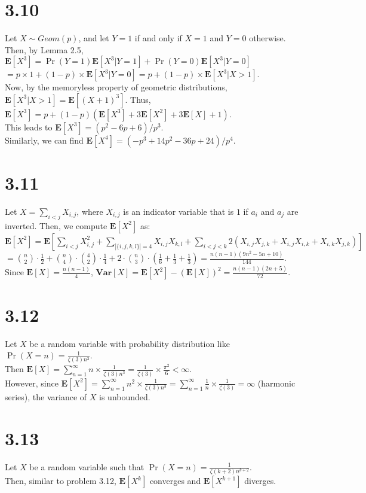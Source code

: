\documentclass{article}
\begin{document}
\section*{3.10}
Let $X\sim Geom(p)$, and let $Y=1$ if and only if $X=1$ and $Y=0$ otherwise. Then, by Lemma 2.5,
$\textbf{E}[X^3]=\Pr(Y=1)\textbf{E}[X^3|Y=1]+\Pr(Y=0)\textbf{E}[X^3|Y=0]$\\
$=p\times 1 + (1-p)\times \textbf{E}[X^3|Y=0]=p+(1-p)\times\textbf{E}[X^3|X>1]$.\\
Now, by the memoryless property of geometric distributions, $\textbf{E}[X^3|X>1]=\textbf{E}[(X+1)^3]$.
Thus, $\textbf{E}[X^3]=p+(1-p)(\textbf{E}[X^3]+3\textbf{E}[X^2]+3\textbf{E}[X]+1)$.\\
This leads to $\textbf{E}[X^3]=(p^2-6p+6)/p^3$.\\
Similarly, we can find $\textbf{E}[X^4]=(-p^3+14p^2-36p+24)/p^4$.
\section*{3.11}
Let $X=\sum\limits_{i<j} X_{i,j}$, where $X_{i,j}$ is an indicator variable that is $1$ if $a_i$ and $a_j$ are inverted. Then, we compute $\textbf{E}[X^2]$ as:\\
$\textbf{E}[X^2]=\textbf{E}[\sum\limits_{i<j}X_{i,j}^2 +\sum\limits_{|\{i,j,k,l\}|=4}X_{i,j}X_{k,l} + \sum\limits_{i<j<k}2(X_{i,j}X_{j,k}+X_{i,j}X_{i,k}+X_{i,k}X_{j,k})]$
$=\binom{n}{2}\cdot\frac{1}{2}+\binom{n}{4}\cdot\binom{4}{2}\cdot\frac{1}{4}+2\cdot\binom{n}{3}\cdot\left( \frac{1}{6}+\frac{1}{3}+\frac{1}{3}\right)=\frac{n(n-1)(9n^2-5n+10)}{144}$.\\
Since $\textbf{E}[X]=\frac{n(n-1)}{4}$, $\textbf{Var}[X]=\textbf{E}[X^2]-(\textbf{E}[X])^2=\frac{n(n-1)(2n+5)}{72}$.
\section*{3.12}
Let $X$ be a random variable with probability distribution like $\Pr(X=n)=\frac{1}{\zeta (3)n^3}$.\\
Then $\textbf{E}[X]=\sum\limits_{n=1}^\infty n\times\frac{1}{\zeta (3)n^3}=\frac{1}{\zeta(3)}\times\frac{\pi^2}{6}<\infty$.\\
However, since $\textbf{E}[X^2]=\sum\limits_{n=1}^\infty n^2\times\frac{1}{\zeta (3)n^3}=\sum\limits_{n=1}^\infty \frac{1}{n}\times\frac{1}{\zeta (3)}=\infty$ (harmonic series), the variance of $X$ is unbounded.
\section*{3.13}
Let $X$ be a random variable such that $\Pr(X=n)=\frac{1}{\zeta (k+2)n^{k+2}}$.\\
Then, similar to problem 3.12, $\textbf{E}[X^k]$ converges and $\textbf{E}[X^{k+1}]$ diverges.
\end{document}
